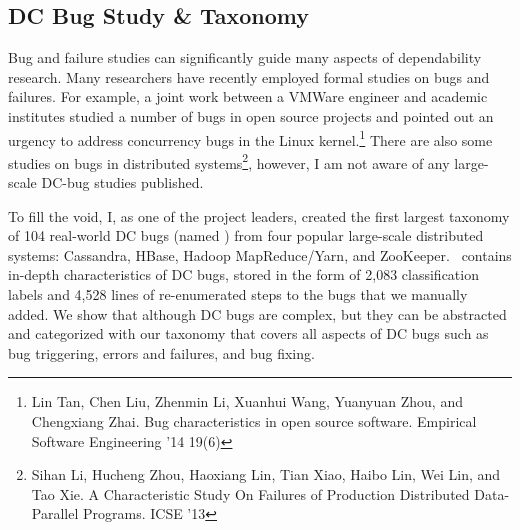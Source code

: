 \documentclass[10pt]{article}
\begin{document}
\subsection{DC Bug Study \& Taxonomy} 

Bug and failure studies can significantly guide many aspects of dependability
research. Many researchers have recently employed formal studies on bugs and
failures. For example, a joint work between a VMWare engineer and academic
institutes studied a number of bugs in open source projects and pointed out an
urgency to address concurrency bugs in the Linux kernel.\footnote{Lin Tan, Chen
Liu, Zhenmin Li, Xuanhui Wang, Yuanyuan Zhou, and Chengxiang Zhai. Bug
characteristics in open source software. Empirical Software Engineering '14
19(6)}
%
There are also some studies on bugs in distributed systems\footnote{Sihan Li,
Hucheng Zhou, Haoxiang Lin, Tian Xiao, Haibo Lin, Wei Lin, and Tao Xie. A
Characteristic Study On Failures of Production Distributed Data-Parallel
Programs. ICSE '13}, however, I am not aware of any large-scale DC-bug studies
published. 

To fill the void, I, as one of the project leaders, created the
first largest taxonomy of 104 real-world DC bugs (named \taxdc)
\cite{Leesatapornwongsa+16-TaxDC} from four popular large-scale distributed
systems: Cassandra, HBase, Hadoop MapReduce/Yarn, and ZooKeeper.  \taxdc\
contains in-depth characteristics of DC bugs, stored in the form of 2,083
classification labels and 4,528 lines of re-enumerated steps to the bugs that
we manually added. We show that although DC bugs are complex, but they can be
abstracted and categorized with our taxonomy that covers all aspects of DC bugs
such as bug triggering, errors and failures, and bug fixing.


%

\end{document}
